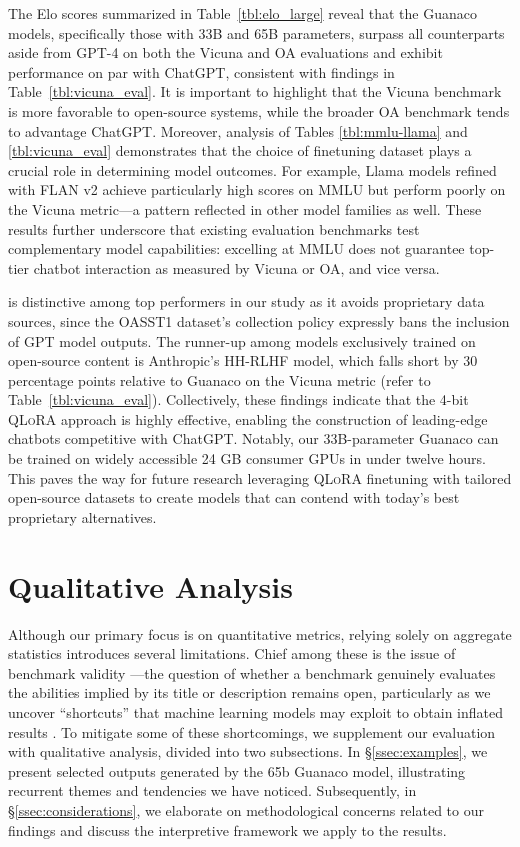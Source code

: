 The Elo scores summarized in Table~\ref{tbl:elo_large} reveal that the {Guanaco} models, specifically those with 33B and 65B parameters, surpass all counterparts aside from GPT-4 on both the Vicuna and OA evaluations and exhibit performance on par with ChatGPT, consistent with findings in Table~\ref{tbl:vicuna_eval}. It is important to highlight that the Vicuna benchmark is more favorable to open-source systems, while the broader OA benchmark tends to advantage ChatGPT. Moreover, analysis of Tables \ref{tbl:mmlu-llama} and \ref{tbl:vicuna_eval} demonstrates that the choice of finetuning dataset plays a crucial role in determining model outcomes. For example, Llama models refined with FLAN v2 achieve particularly high scores on MMLU but perform poorly on the Vicuna metric—a pattern reflected in other model families as well. These results further underscore that existing evaluation benchmarks test complementary model capabilities: excelling at MMLU does not guarantee top-tier chatbot interaction as measured by Vicuna or OA, and vice versa.

is distinctive among top performers in our study as it avoids proprietary data sources, since the OASST1 dataset's collection policy expressly bans the inclusion of GPT model outputs. The runner-up among models exclusively trained on open-source content is Anthropic's HH-RLHF model, which falls short by 30 percentage points relative to {Guanaco} on the Vicuna metric (refer to Table~\ref{tbl:vicuna_eval}). Collectively, these findings indicate that the 4-bit \textsc{QLoRA} approach is highly effective, enabling the construction of leading-edge chatbots competitive with ChatGPT. Notably, our 33B-parameter {Guanaco} can be trained on widely accessible 24 GB consumer GPUs in under twelve hours. This paves the way for future research leveraging \textsc{QLoRA} finetuning with tailored open-source datasets to create models that can contend with today’s best proprietary alternatives.

\section{Qualitative Analysis}

Although our primary focus is on quantitative metrics, relying solely on aggregate statistics introduces several limitations. Chief among these is the issue of benchmark validity \citep{liao2021we}—the question of whether a benchmark genuinely evaluates the abilities implied by its title or description remains open, particularly as we uncover ``shortcuts'' that machine learning models may exploit to obtain inflated results \citep{gururangan2018annotation, poliak2018hypothesis}. To mitigate some of these shortcomings, we supplement our evaluation with qualitative analysis, divided into two subsections. In \S\ref{ssec:examples}, we present selected outputs generated by the 65b {Guanaco} model, illustrating recurrent themes and tendencies we have noticed. Subsequently, in \S\ref{ssec:considerations}, we elaborate on methodological concerns related to our findings and discuss the interpretive framework we apply to the results.

